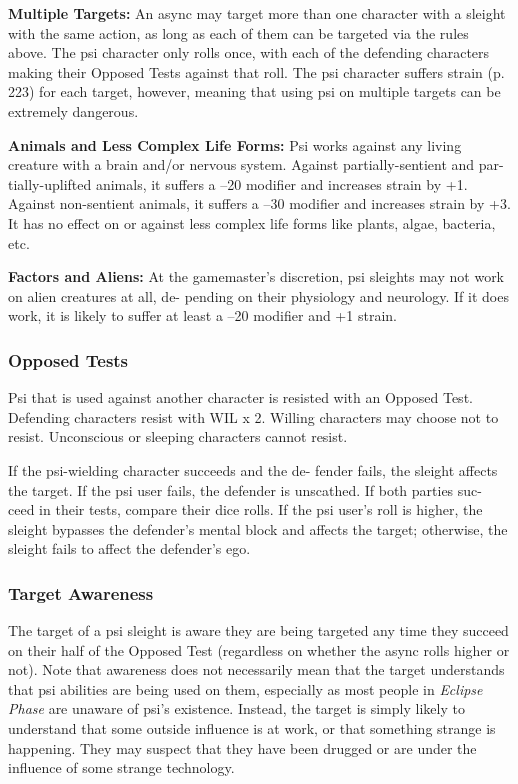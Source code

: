 \textbf{Multiple Targets:} An async may target more than 
one character with a sleight with the same action, as 
long as each of them can be targeted via the rules 
above. The psi character only rolls once, with each of 
the defending characters making their Opposed Tests 
against that roll. The psi character suffers strain (p. 
223) for each target, however, meaning that using psi 
on multiple targets can be extremely dangerous.

\textbf{Animals and Less Complex Life Forms:} Psi works 
against any living creature with a brain and/or 
nervous system. Against partially-sentient and par-
tially-uplifted animals, it suffers a –20 modifier and 
increases strain by +1. Against non-sentient animals, 
it suffers a –30 modifier and increases strain by +3. It 
has no effect on or against less complex life forms like 
plants, algae, bacteria, etc.

\textbf{Factors and Aliens:} At the gamemaster's discretion, 
psi sleights may not work on alien creatures at all, de-
pending on their physiology and neurology. If it does 
work, it is likely to suffer at least a –20 modifier and 
+1 strain.

\subsubsection{Opposed Tests}

Psi that is used against another character is resisted 
with an Opposed Test. Defending characters resist with 
WIL x 2. Willing characters may choose not to resist. 
Unconscious or sleeping characters cannot resist.

If the psi-wielding character succeeds and the de-
fender fails, the sleight affects the target. If the psi user 
fails, the defender is unscathed. If both parties suc-
ceed in their tests, compare their dice rolls. If the psi 
user's roll is higher, the sleight bypasses the defender's 
mental block and affects the target; otherwise, the 
sleight fails to affect the defender's ego.

\subsubsection{Target Awareness}

The target of a psi sleight is aware they are being 
targeted any time they succeed on their half of the 
Opposed Test (regardless on whether the async 
rolls higher or not). Note that awareness does not 
necessarily mean that the target understands that psi 
abilities are being used on them, especially as most 
people in \textit{Eclipse Phase} are unaware of psi's existence. 
Instead, the target is simply likely to understand that 
some outside influence is at work, or that something 
strange is happening. They may suspect that they 
have been drugged or are under the influence of some 
strange technology.

